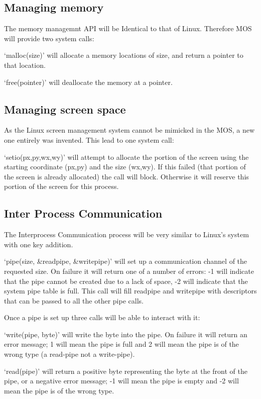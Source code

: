 \documentclass[a4paper]{report}
\begin{document}
\subsection{Managing memory}

The memory managemnt API will be Identical to that of Linux. Therefore MOS will provide two system calls:

`malloc(size)' will allocate a memory locations of size, and return a pointer to that location.

`free(pointer)' will deallocate the memory at a pointer.

\subsection{Managing screen space}

As the Linux screen management system cannot be mimicked in the MOS, a new one entirely was invented. This lead to one system call:

`setio(px,py,wx,wy)' will attempt to allocate the portion of the screen using the starting coordinate (px,py) and the size (wx,wy). If this failed (that portion of the screen is already allocated) the call will block. Otherwise it will reserve this portion of the screen for this process.


\subsection{Inter Process Communication}

The Interprocess Communication process will be very similar to Linux's system with one key addition.

`pipe(size, \&readpipe, \&writepipe)' will set up a communication channel of the requested size. On failure it will return one of a number of errors: -1 will indicate that the pipe cannot be created due to a lack of space, -2 will indicate that the system pipe table is full. This call will fill readpipe and writepipe with descriptors that can be passed to all the other pipe calls.

Once a pipe is set up three calls will be able to interact with it:

`write(pipe, byte)' will write the byte into the pipe. On failure it will return an error message; 1 will mean the pipe is full and 2 will mean the pipe is of the wrong type (a read-pipe not a write-pipe).

`read(pipe)' will return a positive byte representing the byte at the front of the pipe, or a negative error message; -1 will mean the pipe is empty and -2 will mean the pipe is of the wrong type.
\end{document}
